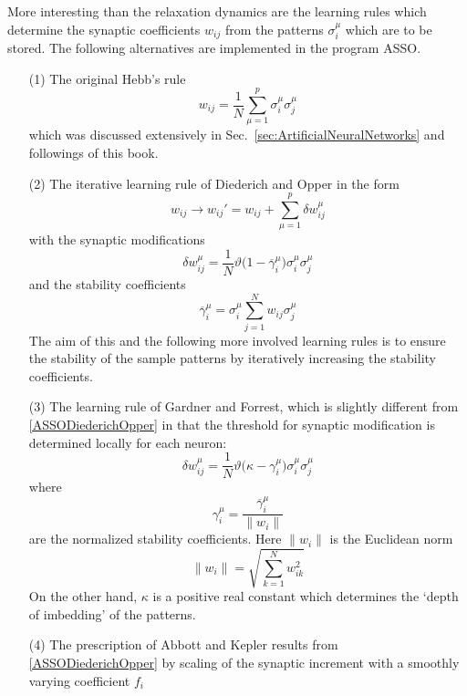 More interesting than the relaxation dynamics are the learning rules which determine the synaptic coefficients $w_{ij}$ from the patterns $\sigma_i^\mu$ which are to be stored. The following alternatives are implemented in the program ASSO.
\begin{itemize}
\item[(1)] The original Hebb's rule
\begin{equation}\label{ASSOHebb}
w_{ij}=\frac{1}{N}\sum_{\mu=1}^p\sigma_i^\mu\sigma_j^\mu
\end{equation}
which was discussed extensively in Sec.~\ref{sec:ArtificialNeuralNetworks} and followings of this book.
\item[(2)] The iterative learning rule of Diederich and Opper in the form
\begin{equation}
w_{ij}\rightarrow w_{ij}'=w_{ij}+\sum_{\mu=1}^p\delta w_{ij}^\mu
\end{equation}
with the synaptic modifications
\begin{equation}\label{ASSODiederichOpper}
\delta w_{ij}^\mu=\frac{1}{N}\vartheta\bigl(1-\overline{\gamma}_i^\mu\bigr)\sigma_i^\mu\sigma_j^\mu
\end{equation}
and the stability coefficients
\begin{equation}
\overline{\gamma}_i^\mu=\sigma_i^\mu\sum_{j=1}^Nw_{ij}\sigma_j^\mu
\end{equation}
The aim of this and the following more involved learning rules is to ensure the stability of the sample patterns by iteratively increasing the stability coefficients.
\item[(3)] The learning rule of Gardner and Forrest, which is slightly different from \eqref{ASSODiederichOpper} in that the threshold for synaptic modification is determined locally for each neuron:
\begin{equation}
\delta w_{ij}^\mu=\frac{1}{N}\vartheta\bigl(\kappa-\gamma_i^\mu)\sigma_i^\mu\sigma_j^\mu
\end{equation}
where
\begin{equation}\label{NormalizedStability}
\gamma_i^\mu=\frac{\overline{\gamma}_i^\mu}{\|w_i\|}
\end{equation}
are the normalized stability coefficients. Here $\|w_i\|$ is the Euclidean norm
\begin{equation}
\|w_i\|=\sqrt{\sum_{k=1}^Nw_{ik}^2}
\end{equation}
On the other hand, $\kappa$ is a positive real constant which determines the `depth of imbedding' of the patterns.
\item[(4)] The prescription of Abbott and Kepler results from \eqref{ASSODiederichOpper} by scaling of the synaptic increment with a smoothly varying coefficient $f_i$

\end{itemize}
